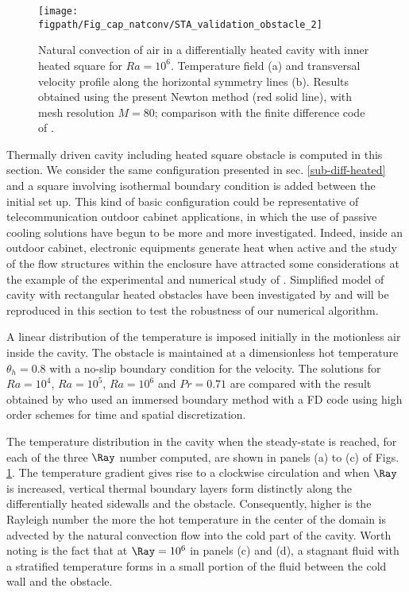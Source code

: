 \begin{figure}
	\begin{center}
		\texttt{[image: \\figpath/Fig\_cap\_natconv/STA\_validation\_obstacle\_2]} 
	\end{center}
	\caption{Natural convection of air in a differentially heated cavity with inner heated square for $Ra = 10^6$. Temperature field (a) and transversal velocity profile along the  horizontal symmetry lines (b). Results obtained using the present Newton method (red solid line), with mesh resolution $M=80$; comparison with the finite difference code of \cite{Raluca2013}.}
	\label{fig-obst-2D}
\end{figure}

Thermally driven cavity including heated square obstacle is computed in this section.
We consider the same configuration presented in sec. \ref{sub-diff-heated} and a square involving isothermal boundary condition is added between the initial set up.
This kind of basic configuration could be representative of telecommunication outdoor cabinet applications, in which the use of passive cooling solutions have begun to be more and more investigated.
Indeed, inside an outdoor cabinet, electronic equipments generate heat when active and the study of the flow structures within the enclosure have attracted some considerations at the example of the experimental and numerical study of \cite{Raluca2013}.
Simplified model of cavity with rectangular heated obstacles have been investigated by \cite{Raluca2013} and will be reproduced in this section to test the robustness of our numerical algorithm.

A linear distribution of the temperature is imposed initially in the motionless air inside the cavity.
The obstacle is maintained at a dimensionless hot temperature $\theta_h = 0.8$ with a no-slip boundary condition for the velocity.
The solutions for $Ra = 10^4$, $Ra = 10^5$, $Ra = 10^6$ and $Pr = 0.71$ are compared with the result obtained by \cite{Raluca2013} who used an immersed boundary method with a FD code using high order schemes for time and spatial discretization.

The temperature distribution in the cavity when the steady-state is reached, for each of the three $\Ray$ number computed, are shown in panels (a) to (c) of Figs. \ref{fig-obst-2D}.
The temperature gradient gives rise to a clockwise circulation and when $\Ray$ is increased, vertical thermal boundary layers form distinctly along the differentially heated sidewalls and the obstacle.
Consequently, 
higher is the Rayleigh number the more the hot temperature in the center of the domain is advected by the natural convection flow into the cold part of the cavity. 
Worth noting is the fact that at $\Ray = 10^6$ in panels (c) and (d), a stagnant fluid with a stratified temperature forms in a small portion of the fluid between the cold wall and the obstacle.

